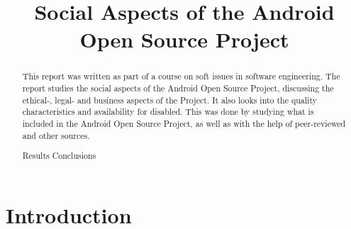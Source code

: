 \documentclass[conference]{IEEEtran}
\begin{document}
\title{Social Aspects of the Android Open Source Project}

\author{
{}
}


\maketitle


\begin{abstract}

This report was written as part of a course on soft issues in software engineering. The report studies the social aspects of the Android Open Source Project, discussing the ethical-, legal- and business aspects of the Project. It also looks into the quality characteristics and availability for disabled. This was done by studying what is included in the Android Open Source Project, as well as with the help of peer-reviewed and other sources. 

Results
Conclusions

\end{abstract}


\section{Introduction}
\end{document}
